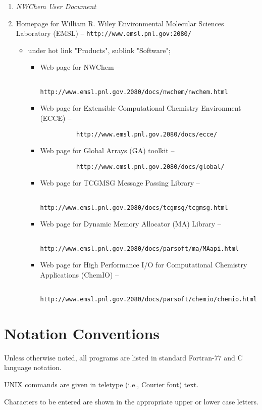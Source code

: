 \begin{enumerate}
\item {\em NWChem User Document}

\item Homepage for William R. Wiley Environmental Molecular Sciences Laboratory
      (EMSL) -- \verb+http://www.emsl.pnl.gov:2080/+

\begin{itemize}

\item under hot link "Products", sublink "Software";

\begin{itemize}
\item Web page for NWChem -- 
\begin{verbatim}
          http://www.emsl.pnl.gov.2080/docs/nwchem/nwchem.html
\end{verbatim}

\item Web page for Extensible Computational Chemistry Environment (ECCE) --
\begin{verbatim}
          http://www.emsl.pnl.gov.2080/docs/ecce/
\end{verbatim}

\item Web page for Global Arrays (GA) toolkit -- 
\begin{verbatim}
          http://www.emsl.pnl.gov.2080/docs/global/
\end{verbatim}

\item Web page for TCGMSG Message Passing Library --
\begin{verbatim}
          http://www.emsl.pnl.gov.2080/docs/tcgmsg/tcgmsg.html
\end{verbatim}

\item Web page for Dynamic Memory Allocator (MA) Library -- 
\begin{verbatim}
          http://www.emsl.pnl.gov.2080/docs/parsoft/ma/MAapi.html
\end{verbatim}

\item Web page for High Performance I/O for Computational Chemistry Applications (ChemIO) --
\begin{verbatim}
          http://www.emsl.pnl.gov.2080/docs/parsoft/chemio/chemio.html
\end{verbatim}
\end{itemize}
\end{itemize}

\end{enumerate}

\section*{Notation Conventions}

Unless otherwise noted, all programs are listed in standard Fortran-77 and C language notation.

UNIX commands are given in teletype (i.e., Courier font) text.

Characters to be entered are shown in the appropriate upper or lower case letters.

